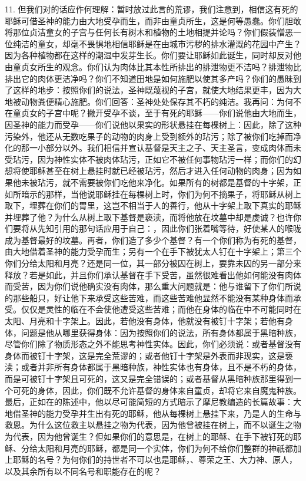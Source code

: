 11. 但我们对的话应作何理解：暂时放过此言的荒谬，我们注意到，相信这有死的耶稣可借圣神的能力由大地受孕而生，而非由童贞所生，这是何等愚蠢。你们胆敢将那位贞洁童女的子宫与任何长有树木和植物的土地相提并论吗？你们假装憎恶一位纯洁的童女，却毫不畏惧地相信耶稣是在由城市污秽的排水灌溉的花园中产生？因为各种植物都在这样的潮湿中发芽生长。你们要让耶稣如此诞生，同时却反对他由童贞女所生的观念。你们认为肉体比其本性所排出的排泄物更不洁吗？排泄物比排出它的肉体更洁净吗？你们不知道田地是如何施肥以使其多产吗？你们的愚昧到了这样的地步：按照你们的说法，圣神既蔑视的子宫，就使大地结果更丰，因为大地被动物粪便精心施肥。你们回答：圣神处处保存其不朽的纯洁。我再问：为何不在童贞女的子宫中呢？撇开受孕不谈，至于有死的耶稣——你们说他由大地而生，因圣神的能力而受孕——你们说他以果实的形状悬挂在每棵树上：因此，除了这种污染外，他还从无数吃果子的动物的肉身上受到额外的玷污；除了被你们吃掉而净化的那一小部分以外。我们相信并宣认基督是天主之子、天主圣言，变成肉体而未受玷污，因为神性实体不被肉体玷污，正如它不被任何事物玷污一样；而你们的幻想将使耶稣甚至在树上悬挂时就已经被玷污，然后才进入任何动物的肉身；因为如果他未被玷污，就不需要被你们吃他来净化。如果所有的树都是基督的十字架，正如所暗示的那样，当他说耶稣挂在每棵树上时，你们为何不摘果子，将耶稣从树上取下，埋葬在你们的胃里，这岂不相当于人的善行，他从十字架上取下真实的耶稣并埋葬了他？为什么从树上取下基督是亵渎，而将他放在坟墓中却是虔诚？也许你们要将从先知引用的那句话应用于自己：，因此你们张着嘴等待，好使某人的喉咙成为基督最好的坟墓。再者，你们造了多少个基督？有一个你们称为有死的基督，由大地借着圣神的能力受孕而生；另有一个在手下被犹太人钉在十字架上；第三个你们分给太阳和月亮？还是同一位，其一部分被囚在树上，要靠未囚的另一部分来释放？若是如此，并且你们承认基督在手下受苦，虽然很难看出他如何能没有肉体而受苦，因为你们说他确实没有肉体，那么重大问题就是：他与谁留下了你们所说的那些船只，好让他下来承受这些苦难，而这些苦难他显然不能没有某种身体而承受。仅仅是灵性的临在不会使他遭受这些苦难；而他在身体的临在中不可能同时在太阳、月亮和十字架上。因此，若他没有身体，他就没有被钉十字架；若他有身体，问题是他从哪里获得身体：因为按照你们的说法，所有身体都属于黑暗种族，尽管你们除了物质形态之外不能思考神性实体。因此，你们必须说：或者基督没有身体而被钉十字架，这是完全荒谬的；或者他钉十字架是外表而非现实，这是亵渎；或者并非所有身体都属于黑暗种族，神性实体也有身体，且不是不朽的身体，而是可被钉十字架且可死的，这又是完全错误的；或者基督从黑暗种族那里得到一个可死的身体，因此，你们既不允许基督的身体来自童贞，却将它来自魔鬼种族。最后，正如在的陈述中，他以尽可能简短的方式暗示了摩尼教编造的长篇故事：大地借圣神的能力受孕并生出有死的耶稣，他从每棵树上悬挂下来，乃是人的生命与救恩。为什么这位救主以悬挂之物为代表，因为他曾被挂在树上，而不以诞生之物为代表，因为他曾诞生？但如果你们的意思是，在树上的耶稣、在手下被钉死的耶稣、分给太阳和月亮的耶稣，都是同一个实体，你们为何不给你们整群的神祇都加上耶稣的名号？为何你们的持世者不可以也是耶稣，、尊荣之王、大力神、原人，以及其余所有以不同名号和职能存在的呢？\par

